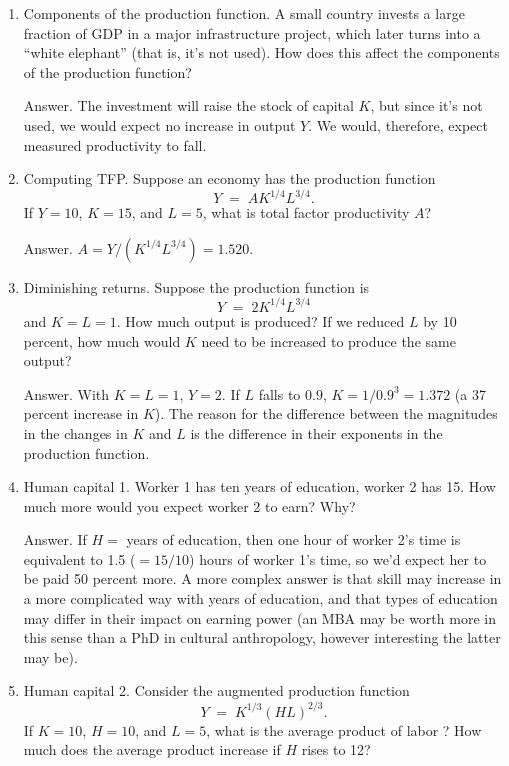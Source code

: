 \begin{enumerate}

\item Components of the production function.  A small country invests a large fraction of GDP in a major
infrastructure project, which later turns into a ``white elephant''
(that is, it's not used).
How does this affect the components of the
production function?

Answer.
The investment will raise the stock of capital $K$,
but since it's not used, we would expect no increase in output $Y$.
We would, therefore, expect measured productivity to fall.

\item Computing TFP.  Suppose an economy has the production function
\[
    Y \;=\; A K^{1/4} L^{3/4} .
\]
If $ Y= 10$, $K=15$, and $L = 5$,
what is total factor productivity $A$?

Answer.  $ A = Y / (K^{1/4} L^{3/4}) = 1.520$.


\item Diminishing returns.  Suppose the production function is
\[
    Y \;=\; 2 K^{1/4} L^{3/4}
\]
and $K=L = 1$. How much output is produced? If we reduced $L$ by
10 percent, how much would $K$ need to be increased to produce the same
output?

Answer.  With $K=L=1$, $Y = 2$.
If $L$ falls to $0.9$, $K = 1/0.9^3 = 1.372$
(a 37 percent increase in $K$).
The reason for the difference between the magnitudes in the changes in
$K$ and $L$ is the difference in their exponents in the production function.


\item Human capital 1. Worker 1 has ten years of education, worker 2 has 15.  How much
more would you expect worker 2 to earn?  Why?

Answer.  If $H = $ years of education, then one hour of worker 2's
time is equivalent to 1.5 ($=15/10$) hours of worker 1's time, so
we'd expect her to be paid 50 percent more. A more complex answer is
that skill may increase in a more complicated way with years of
education, and that types of education may differ in their impact
on earning power (an MBA may be worth more in this sense than a
PhD in cultural anthropology, however interesting the latter may
be).

\item Human capital  2. Consider the augmented production function
\[
    Y \;=\;  K^{1/3} (HL)^{2/3} .
\]
If $K=10$, $H=10$, and $L=5$, what is the average product of labor
?
How much does the average product increase if $H$ rises to 12?


\end{enumerate}
